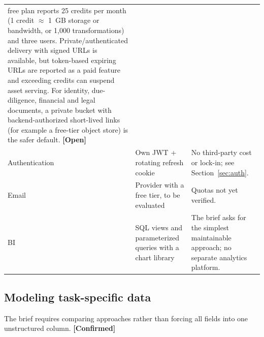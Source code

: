 \documentclass[11pt,a4paper]{article}
\newcommand{\tagconf}{\textcolor{green!45!black}{\textbf{[Confirmed]}}}
\newcommand{\tagopen}{\textcolor{red!70!black}{\textbf{[Open]}}}
\begin{document}
\begin{longtable}{@{}L{2.4cm}L{3.6cm}L{9.8cm}@{}}
	free
	plan reports 25 credits per month (1 credit $\approx$ 1~GB storage or
	bandwidth,
	or 1,000 transformations) and three users. Private/authenticated delivery with
	signed URLs is available, but token-based expiring URLs are reported as a paid
	feature and exceeding credits can suspend asset serving. For identity,
	due-diligence, financial and legal documents, a private bucket with
	backend-authorized short-lived links (for example a free-tier object store) is
	the safer default. \tagopen{}
	\\
	Authentication                                                & Own JWT +
	rotating refresh cookie
	                                                              & No third-party
	cost or lock-in; see
	Section~\ref{sec:auth}.
	\\
	Email                                                         & Provider with
	a free tier, to be evaluated
	                                                              & Quotas not yet
	verified.
	\\
	BI                                                            & SQL views and
	parameterized queries with a chart library                    & The brief asks
	for the simplest maintainable approach; no separate analytics platform.
	\\
	\bottomrule
\end{longtable}

\subsection{Modeling task-specific data}

The brief requires comparing approaches rather than forcing all fields into one
unstructured column. \tagconf{}
\end{document}
